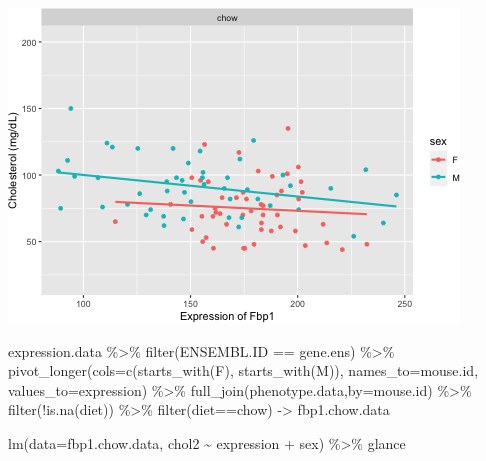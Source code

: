 \documentclass[
]{article}
\newenvironment{Shaded}{\begin{snugshade}}{\end{snugshade}}
\newcommand{\AttributeTok}[1]{\textcolor[rgb]{0.77,0.63,0.00}{#1}}
\newcommand{\FunctionTok}[1]{\textcolor[rgb]{0.00,0.00,0.00}{#1}}
\newcommand{\NormalTok}[1]{#1}
\newcommand{\OtherTok}[1]{\textcolor[rgb]{0.56,0.35,0.01}{#1}}
\newcommand{\SpecialCharTok}[1]{\textcolor[rgb]{0.00,0.00,0.00}{#1}}
\newcommand{\StringTok}[1]{\textcolor[rgb]{0.31,0.60,0.02}{#1}}
\begin{document}
\includegraphics{figures/Fbp1-associations-2.png}

\begin{Shaded}
\begin{Highlighting}[]
\NormalTok{expression.data }\SpecialCharTok{\%\textgreater{}\%}
  \FunctionTok{filter}\NormalTok{(ENSEMBL.ID }\SpecialCharTok{==}\NormalTok{ gene.ens) }\SpecialCharTok{\%\textgreater{}\%}
  \FunctionTok{pivot\_longer}\NormalTok{(}\AttributeTok{cols=}\FunctionTok{c}\NormalTok{(}\FunctionTok{starts\_with}\NormalTok{(}\StringTok{\textquotesingle{}F\textquotesingle{}}\NormalTok{),}
                      \FunctionTok{starts\_with}\NormalTok{(}\StringTok{\textquotesingle{}M\textquotesingle{}}\NormalTok{)),}
               \AttributeTok{names\_to=}\StringTok{\textquotesingle{}mouse.id\textquotesingle{}}\NormalTok{,}
               \AttributeTok{values\_to=}\StringTok{\textquotesingle{}expression\textquotesingle{}}\NormalTok{) }\SpecialCharTok{\%\textgreater{}\%}
  \FunctionTok{full\_join}\NormalTok{(phenotype.data,}\AttributeTok{by=}\StringTok{\textquotesingle{}mouse.id\textquotesingle{}}\NormalTok{) }\SpecialCharTok{\%\textgreater{}\%}
  \FunctionTok{filter}\NormalTok{(}\SpecialCharTok{!}\FunctionTok{is.na}\NormalTok{(diet)) }\SpecialCharTok{\%\textgreater{}\%}
  \FunctionTok{filter}\NormalTok{(diet}\SpecialCharTok{==}\StringTok{\textquotesingle{}chow\textquotesingle{}}\NormalTok{) }\OtherTok{{-}\textgreater{}}\NormalTok{ fbp1.chow.data}

\FunctionTok{lm}\NormalTok{(}\AttributeTok{data=}\NormalTok{fbp1.chow.data, chol2 }\SpecialCharTok{\textasciitilde{}}\NormalTok{ expression }\SpecialCharTok{+}\NormalTok{ sex) }\SpecialCharTok{\%\textgreater{}\%}
\NormalTok{  glance}
\end{Highlighting}
\end{Shaded}
\end{document}
